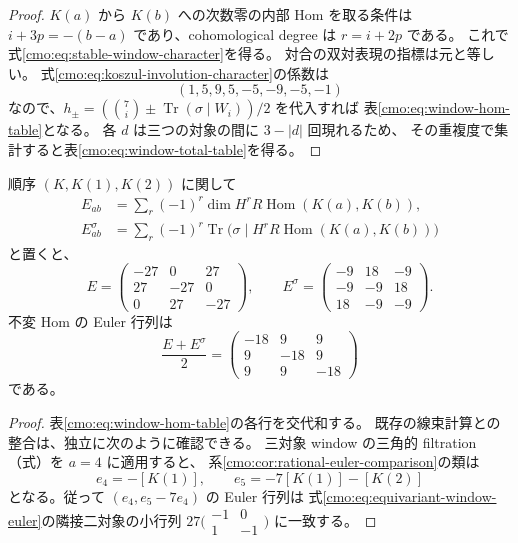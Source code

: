 \begin{proof}
$K(a)$ から $K(b)$ への次数零の内部 Hom を取る条件は
$i+3p=-(b-a)$ であり、cohomological degree は $r=i+2p$ である。
これで式\eqref{cmo:eq:stable-window-character}を得る。
対合の双対表現の指標は元と等しい。
式\eqref{cmo:eq:koszul-involution-character}の係数は
\[
 (1,5,9,5,-5,-9,-5,-1)
\]
なので、$h_\pm=(\binom7i\pm\operatorname{Tr}(\sigma\mid W_i))/2$ を代入すれば
表\eqref{cmo:eq:window-hom-table}となる。
各 $d$ は三つの対象の間に $3-|d|$ 回現れるため、
その重複度で集計すると表\eqref{cmo:eq:window-total-table}を得る。
\end{proof}

\begin{corollary}
\label{cmo:cor:equivariant-window-euler}
順序 $(K,K(1),K(2))$ に関して
\[
 \begin{aligned}
 E_{ab}&=\sum_r(-1)^r\dim H^rR\operatorname{Hom}(K(a),K(b)),\\
 E^\sigma_{ab}&=\sum_r(-1)^r\operatorname{Tr}
       \bigl(\sigma\mid H^rR\operatorname{Hom}(K(a),K(b))\bigr)
 \end{aligned}
\]
と置くと、
\begin{equation}\label{cmo:eq:equivariant-window-euler}
 E=\begin{pmatrix}-27&0&27\\27&-27&0\\0&27&-27\end{pmatrix},
 \qquad
 E^\sigma=\begin{pmatrix}-9&18&-9\\-9&-9&18\\18&-9&-9\end{pmatrix}.
\end{equation}
不変 Hom の Euler 行列は
\[
 \frac{E+E^\sigma}{2}
 =\begin{pmatrix}-18&9&9\\9&-18&9\\9&9&-18\end{pmatrix}
\]
である。
\end{corollary}
\begin{proof}
表\eqref{cmo:eq:window-hom-table}の各行を交代和する。
既存の線束計算との整合は、独立に次のように確認できる。
三対象 window の三角的 filtration
（式）を $a=4$ に適用すると、
系\ref{cmo:cor:rational-euler-comparison}の類は
\[
 e_4=-[K(1)],\qquad e_5=-7[K(1)]-[K(2)]
\]
となる。従って $(e_4,e_5-7e_4)$ の Euler 行列は
式\eqref{cmo:eq:equivariant-window-euler}の隣接二対象の小行列
$27\bigl(\begin{smallmatrix}-1&0\\1&-1\end{smallmatrix}\bigr)$ に一致する。
\end{proof}

